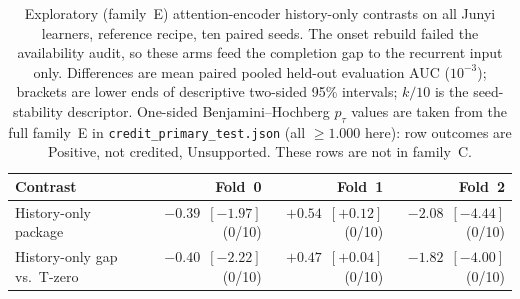 \begin{table}[tbp]
\caption{Exploratory (family~E) attention-encoder history-only contrasts
on all Junyi learners, reference recipe, ten paired seeds. The onset
rebuild failed the availability audit, so these arms feed the completion
gap to the recurrent input only. Differences are mean paired pooled
held-out evaluation AUC ($10^{-3}$); brackets are lower ends of
descriptive two-sided 95\% intervals; $k/10$ is the seed-stability
descriptor. One-sided Benjamini--Hochberg $p_\tau$ values are taken from
the full family~E in \texttt{credit\_primary\_test.json}
(all $\ge 1.000$ here): row outcomes are Positive, not credited, Unsupported.
These rows are not in family~C.}
\label{tab:attn-junyi}
\centering
\footnotesize
\setlength{\tabcolsep}{3pt}
\begin{tabular}{@{}lrrr@{}}
\toprule
Contrast & Fold~0 & Fold~1 & Fold~2 \\
\midrule
History-only package &
$-0.39$~$[-1.97]$ (0/10) &
$+0.54$~$[+0.12]$ (0/10) &
$-2.08$~$[-4.44]$ (0/10) \\
History-only gap vs.\ T-zero &
$-0.40$~$[-2.22]$ (0/10) &
$+0.47$~$[+0.04]$ (0/10) &
$-1.82$~$[-4.00]$ (0/10) \\
\bottomrule
\end{tabular}
\end{table}
